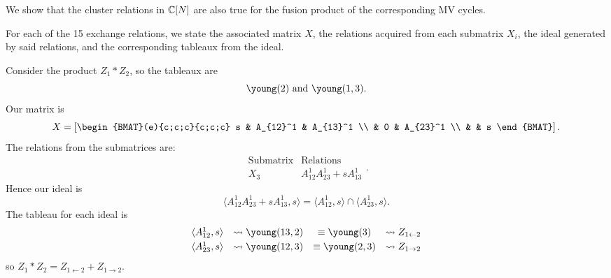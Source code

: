 \documentclass{article} %
\begin{document}
We show that the cluster relations in $\mathbb C[N]$ are also true for the fusion product of the corresponding MV cycles.

For each of the 15 exchange relations, we state the associated matrix $X$, the relations acquired from each submatrix $X_i$, the ideal generated by said relations, and the corresponding tableaux from the ideal.

\begin{example}
Consider the product $Z_1 * Z_2$, so the tableaux are
\[
\young(2) \text{ and } \young(1,3).
\]
Our matrix is
\[
X = \left[\begin{BMAT}(e){c;c;c}{c;c;c}
    s & A_{12}^1 & A_{13}^1 \\
     & 0 & A_{23}^1 \\
     & & s
\end{BMAT}
\right].
\]
The relations from the submatrices are:
\[
\begin{array}{c|c}
    \text{Submatrix} & \text{Relations} \\ \hline
    X_3 & A_{12}^1A_{23}^1+sA_{13}^1
\end{array}.
\]
Hence our ideal is
$$\langle A_{12}^1A_{23}^1+sA_{13}^1,s \rangle = 
\langle A_{12}^1,s \rangle \cap \langle A_{23}^1,s \rangle.$$
The tableau for each ideal is
\[\begin{array}{cccc}\vspace{1mm}
    \langle A_{12}^1,s \rangle &\leadsto \young(13,2) &\equiv \young(3) &\leadsto {Z_{1 \leftarrow 2}} \\ 
    \langle A_{23}^1,s \rangle &\leadsto \young(12,3) &\equiv \young(2,3) &\leadsto{Z_{1 \rightarrow 2}}
\end{array}
\]
so $Z_1 * Z_2 = Z_{1 \leftarrow 2} + Z_{1 \rightarrow 2}$.
\end{example}
\end{document}
